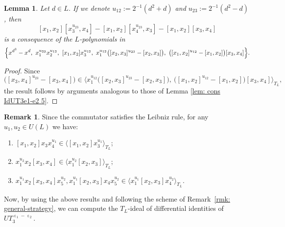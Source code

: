 \documentclass[a4paper,reqno]{amsart}
\newtheorem{lemma}[theorem]{Lemma}
\theoremstyle{definition}
\newtheorem{remark}[theorem]{Remark}
\numberwithin{equation}{section}
\numberwithin{theorem}{section}
\DeclareMathOperator{\e}{\varepsilon}
\begin{document}
\begin{lemma}\label{lem: cons IdUT3e1-e2 6}
    Let $d\in L$. If we denote $u_{12}:=2^{-1}(d^2+d)$ and $u_{23}:=2^{-1}(d^2-d)$, then
   $$
 [x_1,x_2] [x_3^{u_{23}},x_4] - [x_1,x_2] [x_4^{u_{23}},x_3]-[x_1,x_2][x_3,x_4]
$$
is a consequence of the $L$-polynomials in 
\begin{align*}
   \Bigl\{  x^{d^3}-x^{d}, \ x_1^{u_{23}}x_2^{u_{12}}, \ [x_1,x_2]x_3^{u_{12}}, \ x_1^{u_{12}} \big([x_2,x_3]^{u_{23}}-[x_2,x_3]\big),\ \big([x_1,x_2]^{u_{12}}-[x_1,x_2]\big)[x_3,x_4] \Bigr\}.
\end{align*}
\end{lemma}
\begin{proof}
Since
\begin{equation*}
[x_1,x_2] \big([x_3,x_4]^{u_{23}}-[x_3,x_4]\big)\in \langle  x_1^{u_{12}} \big([x_2,x_3]^{u_{23}}-[x_2,x_3]\big),\ \big([x_1,x_2]^{u_{12}}-[x_1,x_2]\big)[x_3,x_4] \rangle_{T_L},
\end{equation*}
the result follows by arguments analogous to those of Lemma \ref{lem: cons IdUT3e1-e2 5}.
\end{proof}



\begin{remark}\label{rmk: leibniz rule comm}
     Since 
     the commutator satisfies the Leibniz rule, for any $u_1,u_2 \in U(L)$ we have:
    \begin{enumerate}
        \item $[x_1,x_2]x_3x_4^{u_{1}}\in \langle  [x_1,x_2]x_3^{u_{1}}\rangle_{T_L} $; 

        \vspace{1ex}
        \item  $ x_1^{u_{2}}x_2 [x_3, x_4]  \in \langle   x_1^{u_{2}}[x_2, x_3]\rangle_{T_L}$; 
        \vspace{1ex}
         \item $  x_1^{u_{1}}x_2[x_3,x_4]x_5^{u_{2}},  x_1^{u_{1}}[x_2,x_3]x_4x_5^{u_{2}} \in \langle x_1^{u_{1}}[x_2,x_3]x_4^{u_{2}} \rangle_{T_L}$.
    \end{enumerate}
\end{remark}







Now, by using the above results and following the scheme of Remark~\ref{rmk: general-strategy},
we can compute the $T_L$-ideal of differential identities of $UT_3^{\e_1-\e_2}.$
\end{document}
